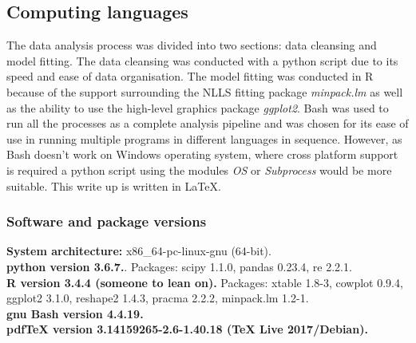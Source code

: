 \documentclass[11pt]{article}
\begin{document}
\begin{linenumbers}
\subsection{Computing languages}
The data analysis process was divided into two sections: data cleansing and model fitting. The data cleansing was conducted with a python script due to its speed and ease of data organisation. The model fitting was conducted in R because of the support surrounding the NLLS fitting package \textit{minpack.lm} as well as the ability to use the high-level graphics package \textit{ggplot2}. Bash was used to run all the processes as a complete analysis pipeline and was chosen for its ease of use in running multiple programs in different languages in sequence. However, as Bash doesn't work on Windows operating system, where cross platform support is required a python script using the modules \textit{OS} or \textit{Subprocess} would be more suitable. This write up is written in \LaTeX. 

\subsubsection{Software and package versions}
\textbf{System architecture:} x86\_64-pc-linux-gnu (64-bit).\\
\textbf{python version 3.6.7.}. Packages: scipy 1.1.0, pandas 0.23.4, re 2.2.1.\\
\textbf{R version 3.4.4 (someone to lean on).} Packages: xtable 1.8-3, cowplot 0.9.4, ggplot2 3.1.0, reshape2 1.4.3, pracma 2.2.2, minpack.lm 1.2-1.\\
\textbf{gnu Bash version 4.4.19.}\\
\textbf{pdfTeX version 3.14159265-2.6-1.40.18 (TeX Live 2017/Debian).}

\end{linenumbers}
\end{document}
